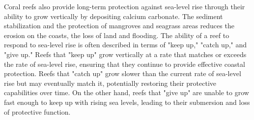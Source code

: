 Coral reefs also provide long-term protection against sea-level rise through their ability to grow vertically by depositing calcium carbonate. The sediment stabilization and the protection of mangroves and seagrass areas reduces the erosion on the coasts, the loss of land and flooding. The ability of a reef to respond to sea-level rise is often described in terms of "keep up," "catch up," and "give up." Reefs that "keep up" grow vertically at a rate that matches or exceeds the rate of sea-level rise, ensuring that they continue to provide effective coastal protection. Reefs that "catch up" grow slower than the current rate of sea-level rise but may eventually match it, potentially restoring their protective capabilities over time. On the other hand, reefs that "give up" are unable to grow fast enough to keep up with rising sea levels, leading to their submersion and loss of protective function. 





